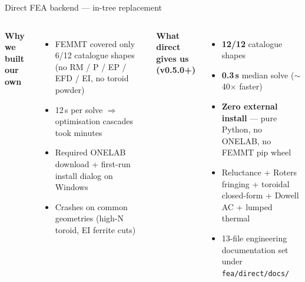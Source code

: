 \documentclass[11pt, aspectratio=169]{beamer}
\begin{document}
\begin{frame}{Direct FEA backend --- in-tree replacement}
  \begin{columns}[T,onlytextwidth]
    \textbf{Why we built our own}
    \begin{itemize}
      \item FEMMT covered only 6/12 catalogue shapes
            (no RM / P / EP / EFD / EI, no toroid powder)
      \item 12\,s per solve $\Rightarrow$ optimisation
            cascades took minutes
      \item Required ONELAB download + first-run
            install dialog on Windows
      \item Crashes on common geometries (high-N toroid,
            EI ferrite cuts)
    \end{itemize}
    \textbf{What direct gives us (v0.5.0+)}
    \begin{itemize}
      \item \textbf{12/12} catalogue shapes
      \item \textbf{0.3\,s} median solve
            ($\sim$40$\times$ faster)
      \item \textbf{Zero external install} --- pure
            Python, no ONELAB, no FEMMT pip wheel
      \item Reluctance + Roters fringing + toroidal
            closed-form + Dowell AC + lumped thermal
      \item 13-file engineering documentation set under
            \texttt{fea/direct/docs/}
    \end{itemize}
  \end{columns}
\end{frame}
\end{document}
